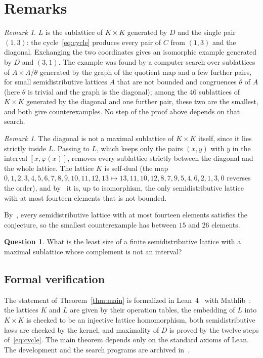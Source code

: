 \documentclass[11pt]{amsart}
\theoremstyle{definition}
\newtheorem{question}[theorem]{Question}
\theoremstyle{remark}
\newtheorem{remark}[theorem]{Remark}
\numberwithin{equation}{section}
\begin{document}
\section{Remarks}

\begin{remark}
$L$ is the sublattice of $K\times K$ generated by $D$ and the single pair $(1,3)$: the cycle~\eqref{eq:cycle} produces every pair of $C$ from $(1,3)$ and the diagonal. Exchanging the two coordinates gives an isomorphic example generated by $D$ and $(3,1)$. The example was found by a computer search over sublattices of $A\times A/\theta$ generated by the graph of the quotient map and a few further pairs, for small semidistributive lattices $A$ that are not bounded and congruences $\theta$ of $A$ (here $\theta$ is trivial and the graph is the diagonal); among the $46$ sublattices of $K\times K$ generated by the diagonal and one further pair, these two are the smallest, and both give counterexamples. No step of the proof above depends on that search.
\end{remark}

\begin{remark}
The diagonal is not a maximal sublattice of $K\times K$ itself, since it lies strictly inside $L$. Passing to $L$, which keeps only the pairs $(x,y)$ with $y$ in the interval $[x,\varphi(x)]$, removes every sublattice strictly between the diagonal and the whole lattice. The lattice $K$ is self-dual (the map $0,1,2,3,4,5,6,7,8,9,10,11,12,13\mapsto13,11,10,12,8,7,9,5,4,6,2,1,3,0$ reverses the order), and by~\cite[Theorem~E and its proof]{Bh} it is, up to isomorphism, the only semidistributive lattice with at most fourteen elements that is not bounded.
\end{remark}

By~\cite[Theorem~E]{Bh}, every semidistributive lattice with at most fourteen elements satisfies the conjecture, so the smallest counterexample has between $15$ and $26$ elements.

\begin{question}
What is the least size of a finite semidistributive lattice with a maximal sublattice whose complement is not an interval?
\end{question}

\subsection*{Formal verification}
The statement of Theorem~\ref{thm:main} is formalized in Lean~4~\cite{MU} with Mathlib~\cite{Mathlib}: the lattices $K$ and $L$ are given by their operation tables, the embedding of $L$ into $K\times K$ is checked to be an injective lattice homomorphism, both semidistributive laws are checked by the kernel, and maximality of $D$ is proved by the twelve steps of~\eqref{eq:cycle}. The main theorem depends only on the standard axioms of Lean. The development and the search programs are archived in~\cite{Ar}.
\end{document}
